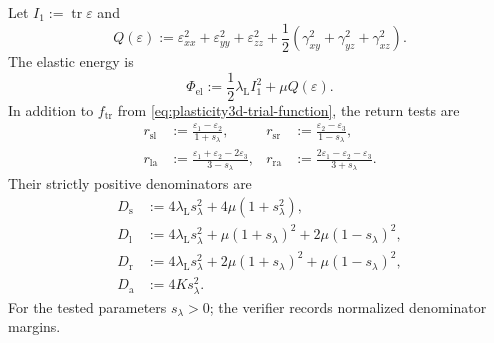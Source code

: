 Let $I_1:=\operatorname{tr}\varepsilon$ and
\begin{equation}
  Q(\varepsilon)
  :=\varepsilon_{xx}^2+\varepsilon_{yy}^2+\varepsilon_{zz}^2
  +\frac12\left(\gamma_{xy}^2+\gamma_{yz}^2+\gamma_{xz}^2\right).
  \label{eq:appendix-engineering-quadratic}
\end{equation}
The elastic energy is
\begin{equation}
  \Phi_{\mathrm{el}}
  :=\frac12\lambda_{\mathrm L}I_1^2+\mu Q(\varepsilon).
  \label{eq:appendix-elastic-branch}
\end{equation}
In addition to $f_{\mathrm{tr}}$ from
\eqref{eq:plasticity3d-trial-function}, the return tests are
\begin{align}
  r_{\mathrm{sl}}&:=\frac{\varepsilon_1-\varepsilon_2}{1+s_\lambda},
  &
  r_{\mathrm{sr}}&:=\frac{\varepsilon_2-\varepsilon_3}{1-s_\lambda},
  \nonumber\\
  r_{\mathrm{la}}&:=
    \frac{\varepsilon_1+\varepsilon_2-2\varepsilon_3}{3-s_\lambda},
  &
  r_{\mathrm{ra}}&:=
    \frac{2\varepsilon_1-\varepsilon_2-\varepsilon_3}{3+s_\lambda}.
  \label{eq:appendix-return-tests}
\end{align}
Their strictly positive denominators are
\begin{align}
  D_{\mathrm s}
  &:=4\lambda_{\mathrm L}s_\lambda^2+4\mu(1+s_\lambda^2),
  \nonumber\\
  D_{\mathrm l}
  &:=4\lambda_{\mathrm L}s_\lambda^2
    +\mu(1+s_\lambda)^2+2\mu(1-s_\lambda)^2,
  \nonumber\\
  D_{\mathrm r}
  &:=4\lambda_{\mathrm L}s_\lambda^2
    +2\mu(1+s_\lambda)^2+\mu(1-s_\lambda)^2,
  \nonumber\\
  D_{\mathrm a}
  &:=4Ks_\lambda^2.
  \label{eq:appendix-branch-denominators}
\end{align}
For the tested parameters $s_\lambda>0$; the verifier records normalized
denominator margins.


